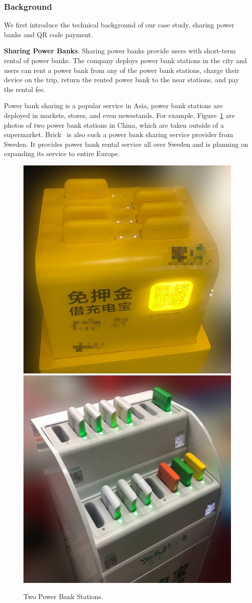 \subsubsection{Background}

We first introduce the technical background of our case study, sharing power
banks and QR code payment.

\textbf{Sharing Power Banks}. Sharing power banks provide users with short-term
rental of power banks. The company deploys power bank stations in the city and
users can rent a power bank from any of the power bank stations, charge their
device on the trip, return the rented power bank to the near stations, and pay
the rental fee.

Power bank sharing is a popular service in Asia, power bank stations are deployed in markets, stores, and even newsstands.
For example, Figure~\ref{fig:PBS_products} are photos of two power bank stations in China, which are taken outside of a supermarket. Brick~\cite{Brick} is also such a power bank sharing service provider from Sweden.
It provides power bank rental service all over Sweden and is planning on expanding its service to entire Europe.
\begin{figure}[t]
	\centering
	\includegraphics[width=.45 \linewidth, height=.45 \linewidth]{./Figs/PBS_mt.png}
	\includegraphics[width=.45 \linewidth, height=.45 \linewidth]{./Figs/PBS_xd.png}
	\caption{Two Power Bank Stations.}
	\label{fig:PBS_products}
\end{figure}

